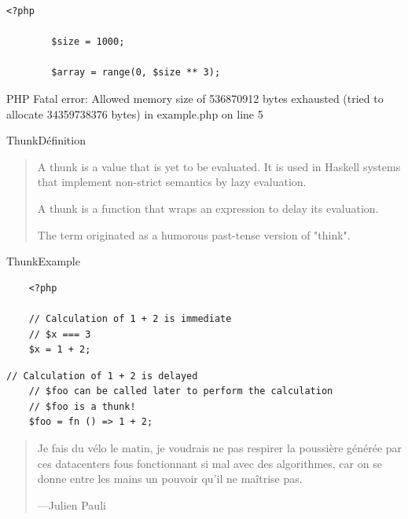 \begin{frame}[fragile]
    \begin{lstlisting}[firstnumber=1]
        <?php

        $size = 1000;

        $array = range(0, $size ** 3);
    \end{lstlisting}
\end{frame}

\begin{frame}[fragile]
    \begin{spverbatim}
        PHP Fatal error: Allowed memory size of 536870912 bytes exhausted (tried to allocate 34359738376 bytes) in example.php on line 5
    \end{spverbatim}
\end{frame}

\begin{frame}{Thunk}{Définition}
    \begin{quote}
        A thunk is a value that is yet to be evaluated. It is used in Haskell systems that implement non-strict semantics by lazy evaluation.

        \pause

        A thunk is a function that wraps an expression to delay its evaluation.

        \pause

        The term originated as a humorous past-tense version of "think".
    \end{quote}
\end{frame}

\begin{frame}[fragile]{Thunk}{Example}
    \begin{lstlisting}
    <?php

    // Calculation of 1 + 2 is immediate
    // $x === 3
    $x = 1 + 2;
    \end{lstlisting}

    \pause

    \begin{lstlisting}[firstnumber=6]
    // Calculation of 1 + 2 is delayed
    // $foo can be called later to perform the calculation
    // $foo is a thunk!
    $foo = fn () => 1 + 2;
    \end{lstlisting}
\end{frame}

\begin{frame}
    \begin{quote}
        Je fais du vélo le matin, je voudrais ne pas respirer la poussière générée
        par ces datacenters fous fonctionnant si mal avec des algorithmes,
        car on se donne entre les mains un pouvoir qu'il ne maîtrise pas.

        \begin{flushright}
            \tiny{---Julien Pauli}
        \end{flushright}
    \end{quote}
\end{frame}

